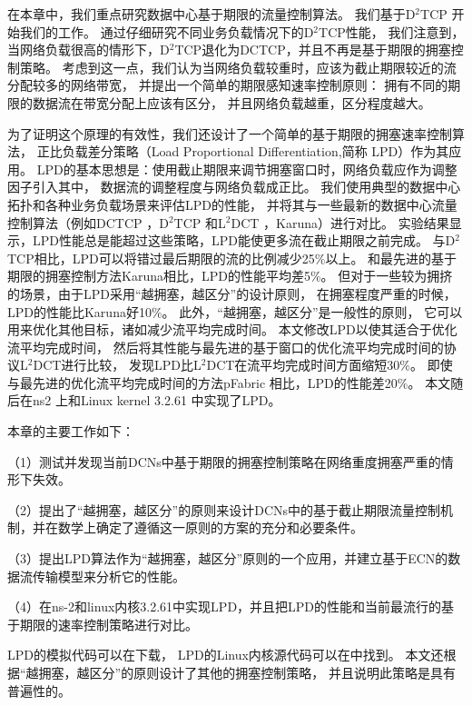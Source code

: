 在本章中，我们重点研究数据中心基于期限的流量控制算法。
我们基于D$^2$TCP\cite{DCTCP} 开始我们的工作。
通过仔细研究不同业务负载情况下的D$^2$TCP性能，
我们注意到，当网络负载很高的情形下，D$^2$TCP退化为DCTCP，并且不再是基于期限的拥塞控制策略。
考虑到这一点，我们认为当网络负载较重时，应该为截止期限较近的流分配较多的网络带宽，
并提出一个简单的期限感知速率控制原则：
拥有不同的期限的数据流在带宽分配上应该有区分，
并且网络负载越重，区分程度越大。


为了证明这个原理的有效性，我们还设计了一个简单的基于期限的拥塞速率控制算法，
正比负载差分策略（Load Proportional Differentiation,简称 LPD）作为其应用。 
LPD的基本思想是：使用截止期限来调节拥塞窗口时，网络负载应作为调整因子引入其中，
数据流的调整程度与网络负载成正比。
我们使用典型的数据中心拓扑和各种业务负载场景来评估LPD的性能，
并将其与一些最新的数据中心流量控制算法（例如DCTCP \cite{DCTCP} ，D$^2$TCP \cite{D2TCP}和L$^2$DCT \cite{L2DCT}，Karuna\cite{chen2016scheduling}）进行对比。
实验结果显示，LPD性能总是能超过这些策略，LPD能使更多流在截止期限之前完成。
与D$^2$TCP相比，LPD可以将错过最后期限的流的比例减少25$\%$以上。
和最先进的基于期限的拥塞控制方法Karuna相比，LPD的性能平均差5$\%$。
但对于一些较为拥挤的场景，由于LPD采用“越拥塞，越区分”的设计原则，
在拥塞程度严重的时候，LPD的性能比Karuna好10$\%$。
此外，“越拥塞，越区分”是一般性的原则，
它可以用来优化其他目标，诸如减少流平均完成时间。
本文修改LPD以使其适合于优化流平均完成时间，
然后将其性能与最先进的基于窗口的优化流平均完成时间的协议L$^2$DCT进行比较，
发现LPD比L$^2$DCT在流平均完成时间方面缩短30$\%$。
即使与最先进的优化流平均完成时间的方法pFabric \cite{pFabric}相比，LPD的性能差20$\%$。
本文随后在ns2 \cite{ns2,LPD-sim-code}上和Linux kernel 3.2.61 \cite{LPD-code}中实现了LPD。

本章的主要工作如下：

（1）测试并发现当前DCNs中基于期限的拥塞控制策略在网络重度拥塞严重的情形下失效。

（2）提出了“越拥塞，越区分”的原则来设计DCNs中的基于截止期限流量控制机制，并在数学上确定了遵循这一原则的方案的充分和必要条件。
 
（3）提出LPD算法作为“越拥塞，越区分”原则的一个应用，并建立基于ECN的数据流传输模型来分析它的性能。
 
（4）在ns-2和linux内核3.2.61中实现LPD，并且把LPD的性能和当前最流行的基于期限的速率控制策略进行对比。
 
 
 LPD的模拟代码可以在\cite{LPD-sim-code}下载，
LPD的Linux内核源代码可以在\cite{LPD-code}中找到。
本文还根据“越拥塞，越区分”的原则设计了其他的拥塞控制策略，
并且说明此策略是具有普遍性的。
 
